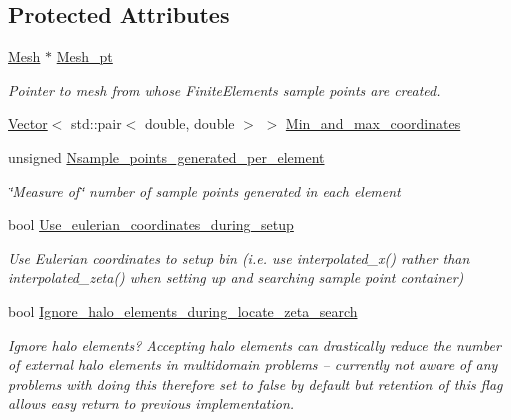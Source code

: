 \subsection*{Protected Attributes}
\begin{DoxyCompactItemize}
\item 
\hyperlink{classoomph_1_1Mesh}{Mesh} $\ast$ \hyperlink{classoomph_1_1SamplePointContainerParameters_a9047299fdfac8074a9996267d66e901e}{Mesh\+\_\+pt}
\begin{DoxyCompactList}\small\item\em Pointer to mesh from whose Finite\+Elements sample points are created. \end{DoxyCompactList}\item 
\hyperlink{classoomph_1_1Vector}{Vector}$<$ std\+::pair$<$ double, double $>$ $>$ \hyperlink{classoomph_1_1SamplePointContainerParameters_a980161906be89a1cf50835fe45949cfe}{Min\+\_\+and\+\_\+max\+\_\+coordinates}
\item 
unsigned \hyperlink{classoomph_1_1SamplePointContainerParameters_a68141123ff5252ad3dd1a8a5279282c4}{Nsample\+\_\+points\+\_\+generated\+\_\+per\+\_\+element}
\begin{DoxyCompactList}\small\item\em \char`\"{}\+Measure of\char`\"{} number of sample points generated in each element \end{DoxyCompactList}\item 
bool \hyperlink{classoomph_1_1SamplePointContainerParameters_ab8757aae90e85b2a860fd07acd19a92a}{Use\+\_\+eulerian\+\_\+coordinates\+\_\+during\+\_\+setup}
\begin{DoxyCompactList}\small\item\em Use Eulerian coordinates to setup bin (i.\+e. use interpolated\+\_\+x() rather than interpolated\+\_\+zeta() when setting up and searching sample point container) \end{DoxyCompactList}\item 
bool \hyperlink{classoomph_1_1SamplePointContainerParameters_ad6ba2b667c746fc6c66830e4f3dc3f70}{Ignore\+\_\+halo\+\_\+elements\+\_\+during\+\_\+locate\+\_\+zeta\+\_\+search}
\begin{DoxyCompactList}\small\item\em Ignore halo elements? Accepting halo elements can drastically reduce the number of external halo elements in multidomain problems -- currently not aware of any problems with doing this therefore set to false by default but retention of this flag allows easy return to previous implementation. \end{DoxyCompactList}\end{DoxyCompactItemize}
